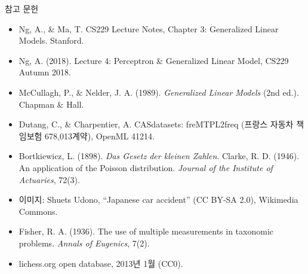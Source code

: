 \documentclass[aspectratio=169,11pt,t]{beamer}
\newcommand{\paperlink}[1]{\href{#1}{\textcolor{ksablue}{\faLink}}}
\begin{document}
\begin{frame}{참고 문헌}
\vfill
\small
\begin{itemize}
\item Ng, A., \& Ma, T. CS229 Lecture Notes, Chapter 3: Generalized Linear Models. Stanford. \paperlink{https://cs229.stanford.edu/main_notes.pdf}
\item Ng, A. (2018). Lecture 4: Perceptron \& Generalized Linear Model, CS229 Autumn 2018. \paperlink{https://www.youtube.com/watch?v=iZTeva0WSTQ}
\item McCullagh, P., \& Nelder, J. A. (1989). \textit{Generalized Linear Models} (2nd ed.). Chapman \& Hall.
\item Dutang, C., \& Charpentier, A. CASdatasets: freMTPL2freq (프랑스 자동차 책임보험 678,013계약), OpenML 41214. \paperlink{https://www.openml.org/d/41214}
\item Bortkiewicz, L. (1898). \textit{Das Gesetz der kleinen Zahlen}. \quad Clarke, R. D. (1946). An application of the Poisson distribution. \textit{Journal of the Institute of Actuaries}, 72(3).
\item 이미지: Shuets Udono, ``Japanese car accident'' (CC BY-SA 2.0), Wikimedia Commons. \paperlink{https://commons.wikimedia.org/wiki/File:Japanese_car_accident.jpg}
\item Fisher, R. A. (1936). The use of multiple measurements in taxonomic problems. \textit{Annals of Eugenics}, 7(2).
\item lichess.org open database, 2013년 1월 (CC0). \paperlink{https://database.lichess.org}
\end{itemize}
\vfill
{}
\end{frame}
\end{document}
